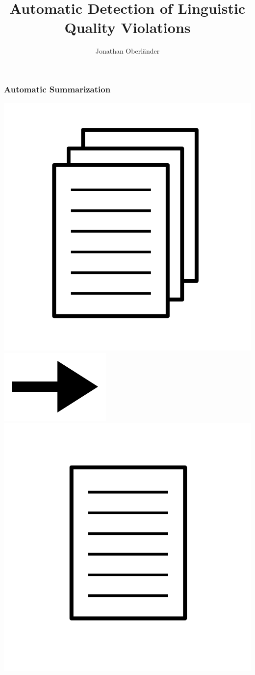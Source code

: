 \documentclass[table]{beamer}
\author{Jonathan Oberländer}
\title[Automatic Detection of LQ Violations\hspace{8em}\insertframenumber]{Automatic Detection of Linguistic Quality Violations} %
\date{}
\institute{Bachelor Thesis Defense\\Universität des Saarlandes\\21.08.2014}
\begin{document}
\maketitle

\begin{frame}
  \frametitle{Automatic Summarization}
  \quad \quad \includegraphics[scale=0.1]{pics/documents.png} \includegraphics[scale=1]{pics/arrowlr.png} \includegraphics[scale=0.1]{pics/document.png}
\end{frame}
\end{document}
